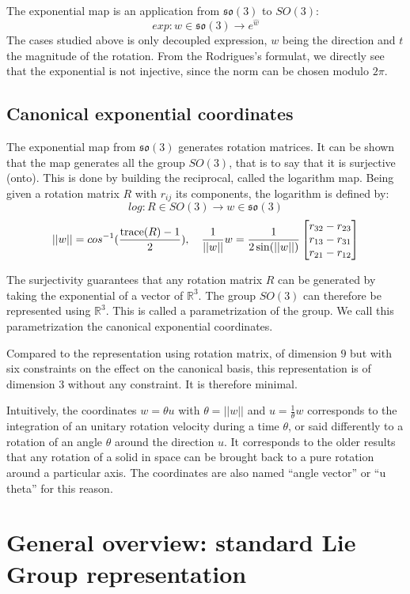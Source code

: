 \documentclass{book}
\begin{document}
The exponential map is an application from $\mathfrak{so}(3)$ to $SO(3)$:
\[ exp: w \in \mathfrak{so}(3) \rightarrow e^{\hat{w}} \]
The cases studied above is only decoupled expression, $w$ being the direction and $t$ the magnitude of the rotation. From the Rodrigues's formulat, we directly see that the exponential is not injective, since the norm can be chosen modulo $2\pi$.


\subsection{Canonical exponential coordinates}

The exponential map from $\mathfrak{so}(3)$ generates rotation matrices. It can be shown that the map generates all the group $SO(3)$, that is to say that it is surjective (onto). This is done by building the reciprocal, called the logarithm map. Being given a rotation matrix $R$ with $r_{ij}$ its components, the logarithm is defined by:
\[ log : R\in SO(3) \rightarrow w \in \mathfrak{so}(3) \]
\[ || w || = cos^{-1} ( \frac{\textrm{trace}(R) -1}{2}) , \quad \frac{1}{||w||} w = \frac{1}{2\sin(||w||)} \begin{bmatrix} r_{32}-r_{23} \\  r_{13}-r_{31} \\  r_{21}-r_{12} \end{bmatrix} \]

The surjectivity guarantees that any rotation matrix $R$ can be generated by taking the exponential of a vector of $\mathbb{R}^3$. The group $SO(3)$ can therefore be represented using $\mathbb{R}^3$. This is called a parametrization of the group. We call this parametrization the canonical exponential coordinates.

Compared to the representation using rotation matrix, of dimension $9$ but with six constraints on the effect on the canonical basis, this representation is of dimension 3 without any constraint. It is therefore minimal. 

Intuitively, the coordinates $w = \theta u$ with $\theta = || w ||$ and $u = \frac{1}{\theta} w$ corresponds to the integration of an unitary rotation velocity during a time $\theta$, or said differently to a rotation of an angle $\theta$ around the direction $u$. It corresponds to the older results that any rotation of a solid in space can be brought back to a pure rotation around a particular axis. The coordinates are also named ``angle vector'' or ``u theta'' for this reason.


\section{General overview: standard Lie Group representation}
\end{document}
